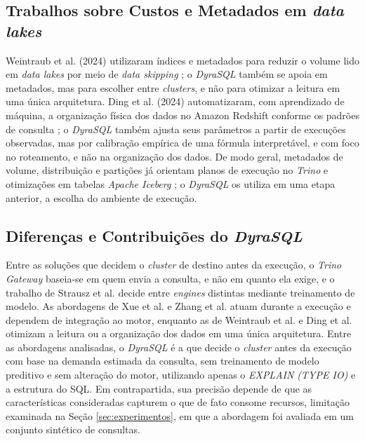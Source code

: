 \subsection{Trabalhos sobre Custos e Metadados em \textit{data lakes}}

Weintraub et al. (2024) utilizaram índices e metadados para reduzir o volume lido em \textit{data lakes} por meio de \textit{data skipping} \cite{weintraub2024}; o \textit{DyraSQL} também se apoia em metadados, mas para escolher entre \textit{clusters}, e não para otimizar a leitura em uma única arquitetura. Ding et al. (2024) automatizaram, com aprendizado de máquina, a organização física dos dados no Amazon Redshift conforme os padrões de consulta \cite{ding2024}; o \textit{DyraSQL} também ajusta seus parâmetros a partir de execuções observadas, mas por calibração empírica de uma fórmula interpretável, e com foco no roteamento, e não na organização dos dados. De modo geral, metadados de volume, distribuição e partições já orientam planos de execução no \textit{Trino} \cite{trinoconcepts} e otimizações em tabelas \textit{Apache Iceberg} \cite{iceberg2024}; o \textit{DyraSQL} os utiliza em uma etapa anterior, a escolha do ambiente de execução.

\subsection{Diferenças e Contribuições do \textit{DyraSQL}}

Entre as soluções que decidem o \textit{cluster} de destino antes da execução, o \textit{Trino Gateway} baseia-se em quem envia a consulta, e não em quanto ela exige, e o trabalho de Strausz et al. decide entre \textit{engines} distintas mediante treinamento de modelo. As abordagens de Xue et al. e Zhang et al. atuam durante a execução e dependem de integração ao motor, enquanto as de Weintraub et al. e Ding et al. otimizam a leitura ou a organização dos dados em uma única arquitetura. Entre as abordagens analisadas, o \textit{DyraSQL} é a que decide o \textit{cluster} antes da execução com base na demanda estimada da consulta, sem treinamento de modelo preditivo e sem alteração do motor, utilizando apenas o \textit{EXPLAIN (TYPE IO)} e a estrutura do SQL. Em contrapartida, sua precisão depende de que as características consideradas capturem o que de fato consome recursos, limitação examinada na Seção \ref{sec:experimentos}, em que a abordagem foi avaliada em um conjunto sintético de consultas.

